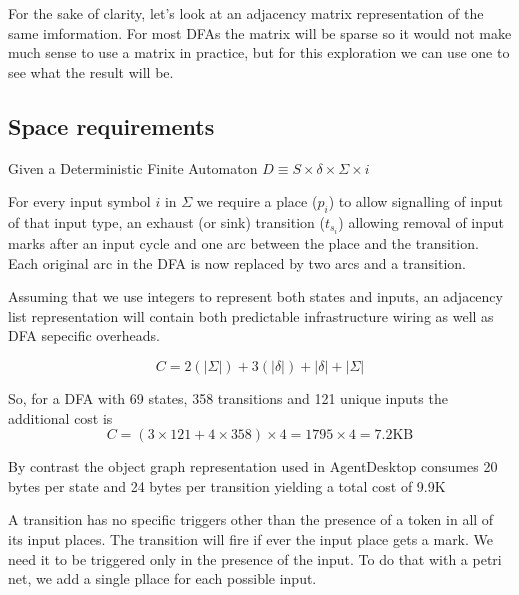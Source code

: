\documentclass[a4paper]{article}
\begin{document}
For the sake of clarity, let's look at an adjacency matrix representation of the
same imformation. For most DFAs the matrix will be sparse so it would not make
much sense to use a matrix in practice, but for this exploration we can use one
to see what the result will be.

\subsection{ Space requirements }

Given a Deterministic Finite Automaton $D \equiv S \times \delta \times \Sigma
\times i$

For every input symbol $i$ in $\Sigma$ we require a place ($p_i$) to allow
signalling of input of that input type, an exhaust (or sink) transition
($t_{s_i}$) allowing removal of input marks after an input cycle and one arc
between the place and the transition. Each original arc in the DFA is now
replaced by two arcs and a transition.

Assuming that we use integers to represent both states and inputs, an adjacency
list representation will contain both predictable infrastructure wiring as well
as DFA sepecific overheads.

\[
C = 2(|\Sigma|) + 3(|\delta|) + |\delta| + |\Sigma|
\]

So, for a DFA with 69 states, 358 transitions and 121 unique inputs the
additional cost is \[
C= (3 \times 121 + 4 \times 358) \times 4
=1795 \times 4
=7.2\mathrm{KB}
\]

By contrast the object graph representation used in AgentDesktop consumes 20
bytes per state and 24 bytes per transition yielding a total cost of 9.9K


A transition has no specific triggers other than the presence of a token in all
of its input places. The transition will fire if ever the input place gets a
mark. We need it to be triggered only in the presence of the input. To do that
with a petri net, we add a single pllace for each possible input.
\end{document}
